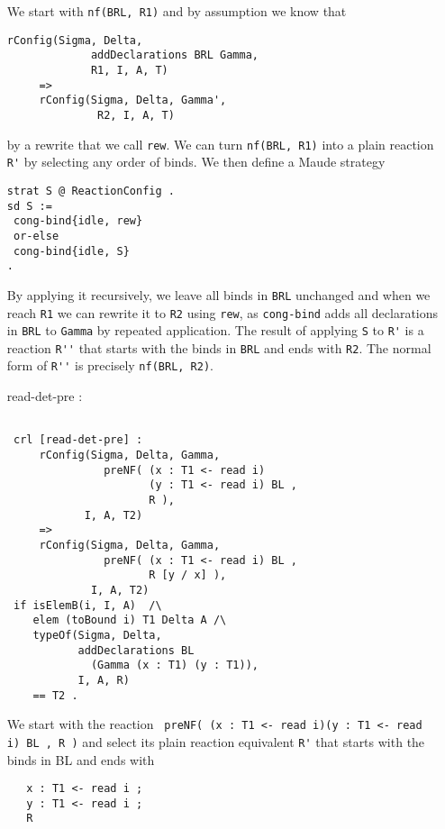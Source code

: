 \documentclass{article}
\begin{document}
\begin{itemize}
We start with \verb+nf(BRL, R1)+ and by assumption we know that
\begin{lstlisting} 
rConfig(Sigma, Delta, 
             addDeclarations BRL Gamma, 
             R1, I, A, T) 
     => 
     rConfig(Sigma, Delta, Gamma', 
              R2, I, A, T) 
  \end{lstlisting}              
by a rewrite that we call \verb+rew+.              
We can turn \verb+nf(BRL, R1)+ into a plain reaction \verb+R'+ 
by selecting any order of binds. 
We then define a Maude strategy 
\begin{lstlisting} 
strat S @ ReactionConfig .
sd S := 
 cong-bind{idle, rew}
 or-else
 cong-bind{idle, S}
.
  \end{lstlisting}
By applying it recursively, we leave all binds in \verb+BRL+ 
unchanged and when we reach
\verb+R1+ we can rewrite it to \verb+R2+ using \verb+rew+,
as \verb+cong-bind+ adds all declarations in \verb+BRL+ to
\verb+Gamma+ by repeated application. 
The result of applying \verb+S+ to \verb+R'+ is a reaction 
\verb+R''+ that starts with the binds in \verb+BRL+
and ends with \verb+R2+.
The normal form of \verb+R''+ is precisely 
\verb+nf(BRL, R2)+.  
 
\item[read-det-pre]:
\begin{lstlisting}     
     
 crl [read-det-pre] :
     rConfig(Sigma, Delta, Gamma, 
               preNF( (x : T1 <- read i)  
                      (y : T1 <- read i) BL , 
                      R ), 
            I, A, T2) 
     =>
     rConfig(Sigma, Delta, Gamma, 
               preNF( (x : T1 <- read i) BL , 
                      R [y / x] ), 
             I, A, T2) 
 if isElemB(i, I, A)  /\ 
    elem (toBound i) T1 Delta A /\
    typeOf(Sigma, Delta, 
           addDeclarations BL 
             (Gamma (x : T1) (y : T1)), 
           I, A, R) 
    == T2 .
   \end{lstlisting} 
   
We start with the reaction
\verb+ preNF( (x : T1 <- read i)(y : T1 <- read i) BL , R )+   
and select its plain reaction equivalent \verb+R'+ 
that starts with the binds in BL
and ends with
 \begin{lstlisting}
   x : T1 <- read i ; 
   y : T1 <- read i ; 
   R
 \end{lstlisting} 


\end{itemize}
\end{document}
